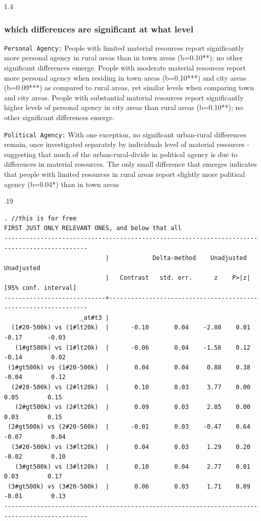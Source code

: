 \documentclass[10pt, letterpaper]{article}
\begin{document}
\begin{spacing}{1.4}
\subsubsection{which differences are significant at what level}
\texttt{Personal Agency:}
People with limited material resources report significantly more personal agency
in rural areas than in town areas (b=0.10**); no other significant differences
emerge.
People with moderate material resources report more personal agency when
residing in town areas (b=0.10***) and city areas (b=0.09***) as compared to
rural areas, yet similar levels when comparing town and city areas.
%
People with substantial material resources report significantly higher levels of
personal agency in city areas than rural areas (b=0.10**); no other significant
differences emerge.

\texttt{Political Agency:}
With one exception, no significant urban-rural differences remain, once investigated separately by individuals level of material resources - suggesting that much of the urban-rural-divide in political agency is due to differences in material resources.
The only small difference that emerges indicates that people with limited
resources in rural areas report slightly more political agency (b=0.04*) than in
town areas



\begin{scriptsize}
\begin{spacing}{.19} 
\begin{verbatim}
. //this is for free
FIRST JUST ONLY RELEVANT ONES, and below that all
---------------------------------------------------------------------------------------------
                            |            Delta-method    Unadjusted           Unadjusted
                            |   Contrast   std. err.      z    P>|z|     [95% conf. interval]
----------------------------+----------------------------------------------------------------
                     _at#t3 |
  (1#20-500k) vs (1#lt20k)  |      -0.10       0.04    -2.80    0.01        -0.17       -0.03
   (1#gt500k) vs (1#lt20k)  |      -0.06       0.04    -1.56    0.12        -0.14        0.02
 (1#gt500k) vs (1#20-500k)  |       0.04       0.04     0.88    0.38        -0.04        0.12
  (2#20-500k) vs (2#lt20k)  |       0.10       0.03     3.77    0.00         0.05        0.15
   (2#gt500k) vs (2#lt20k)  |       0.09       0.03     2.85    0.00         0.03        0.15
 (2#gt500k) vs (2#20-500k)  |      -0.01       0.03    -0.47    0.64        -0.07        0.04
  (3#20-500k) vs (3#lt20k)  |       0.04       0.03     1.29    0.20        -0.02        0.10
   (3#gt500k) vs (3#lt20k)  |       0.10       0.04     2.77    0.01         0.03        0.17
 (3#gt500k) vs (3#20-500k)  |       0.06       0.03     1.71    0.09        -0.01        0.13
---------------------------------------------------------------------------------------------



\end{verbatim}
\end{spacing}
\end{scriptsize}
\end{spacing}
\end{document}
